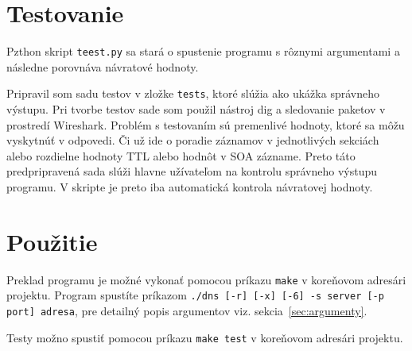 \chapter{Testovanie}\label{chap:testovanie}
Pzthon skript \texttt{teest.py} sa stará o spustenie programu s rôznymi argumentami a následne porovnáva návratové hodnoty.

Pripravil som sadu testov v zložke \texttt{tests}, ktoré slúžia ako ukážka správneho výstupu. Pri tvorbe testov sade som použil nástroj dig a sledovanie paketov v prostredí Wireshark. Problém s testovaním sú premenlivé hodnoty, ktoré sa môžu vyskytnúť v odpovedi. Či už ide o poradie záznamov v jednotlivých sekciách alebo rozdielne hodnoty TTL alebo hodnôt v SOA zázname. Preto táto predpripravená sada slúži hlavne užívateľom na kontrolu správneho výstupu programu. V skripte je preto iba automatická kontrola návratovej hodnoty.



\chapter{Použitie}
Preklad programu je možné vykonať pomocou príkazu \texttt{make} v koreňovom adresári projektu. Program spustíte príkazom \texttt{./dns [-r] [-x] [-6] -s server [-p port] adresa}, pre detailný popis argumentov viz. sekcia~\ref{sec:argumenty}.

Testy možno spustiť pomocou príkazu \texttt{make test} v koreňovom adresári projektu.